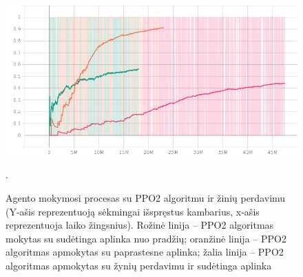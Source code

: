 \documentclass{VUMIFPSbakalaurinis}
\begin{document}
{\begin{figure}[H]
		\includegraphics[scale=0.5]{img/graphs/ppo2_completions}
		\caption{Agento mokymosi procesas su PPO2 algoritmu ir žinių perdavimu (Y-ašis reprezentuoją sėkmingai išspręstus kambarius, x-ašis reprezentuoja laiko žingsnius). Rožinė linija -- PPO2 algoritmas mokytas su sudėtinga aplinka nuo pradžių; oranžinė linija -- PPO2 algoritmas apmokytas su paprastesne aplinka; žalia linija -- PPO2 algoritmas apmokytas su žynių perdavimu ir sudėtinga aplinka}.
		\label{img:ppo2_completions}
	\end{figure}
}
\end{document}
